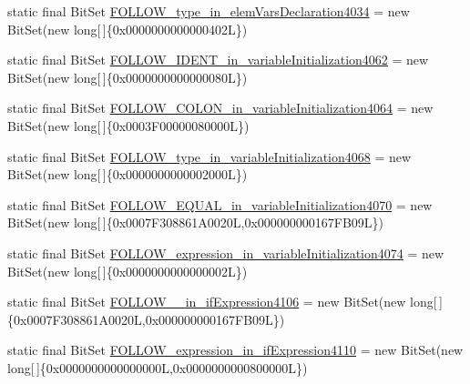 \begin{DoxyCompactItemize}
\item 
static final Bit\-Set \hyperlink{classorg_1_1tzi_1_1use_1_1parser_1_1soil_1_1_soil_parser_a12eb1d63a777ef50a70c44ec4f08d487}{F\-O\-L\-L\-O\-W\-\_\-type\-\_\-in\-\_\-elem\-Vars\-Declaration4034} = new Bit\-Set(new long\mbox{[}$\,$\mbox{]}\{0x0000000000000402\-L\})
\item 
static final Bit\-Set \hyperlink{classorg_1_1tzi_1_1use_1_1parser_1_1soil_1_1_soil_parser_aac9d43ff5383e251ea1eafdb3ba8c1ee}{F\-O\-L\-L\-O\-W\-\_\-\-I\-D\-E\-N\-T\-\_\-in\-\_\-variable\-Initialization4062} = new Bit\-Set(new long\mbox{[}$\,$\mbox{]}\{0x0000000000000080\-L\})
\item 
static final Bit\-Set \hyperlink{classorg_1_1tzi_1_1use_1_1parser_1_1soil_1_1_soil_parser_a033e6a9e5ca95da91d12c2d8c1af298e}{F\-O\-L\-L\-O\-W\-\_\-\-C\-O\-L\-O\-N\-\_\-in\-\_\-variable\-Initialization4064} = new Bit\-Set(new long\mbox{[}$\,$\mbox{]}\{0x0003\-F00000080000\-L\})
\item 
static final Bit\-Set \hyperlink{classorg_1_1tzi_1_1use_1_1parser_1_1soil_1_1_soil_parser_a450526e0ac8f03b5f2e28cf7db2d49fe}{F\-O\-L\-L\-O\-W\-\_\-type\-\_\-in\-\_\-variable\-Initialization4068} = new Bit\-Set(new long\mbox{[}$\,$\mbox{]}\{0x0000000000002000\-L\})
\item 
static final Bit\-Set \hyperlink{classorg_1_1tzi_1_1use_1_1parser_1_1soil_1_1_soil_parser_a358457878361f7db50a3e163aa9dbd37}{F\-O\-L\-L\-O\-W\-\_\-\-E\-Q\-U\-A\-L\-\_\-in\-\_\-variable\-Initialization4070} = new Bit\-Set(new long\mbox{[}$\,$\mbox{]}\{0x0007\-F308861\-A0020\-L,0x000000000167\-F\-B09\-L\})
\item 
static final Bit\-Set \hyperlink{classorg_1_1tzi_1_1use_1_1parser_1_1soil_1_1_soil_parser_aa61f0f308d5d55767c719d23d90a5dc1}{F\-O\-L\-L\-O\-W\-\_\-expression\-\_\-in\-\_\-variable\-Initialization4074} = new Bit\-Set(new long\mbox{[}$\,$\mbox{]}\{0x0000000000000002\-L\})
\item 
static final Bit\-Set \hyperlink{classorg_1_1tzi_1_1use_1_1parser_1_1soil_1_1_soil_parser_a5b3f37bd225b4ba62c2b13f7877f96c7}{F\-O\-L\-L\-O\-W\-\_\-\_\-in\-\_\-if\-Expression4106} = new Bit\-Set(new long\mbox{[}$\,$\mbox{]}\{0x0007\-F308861\-A0020\-L,0x000000000167\-F\-B09\-L\})
\item 
static final Bit\-Set \hyperlink{classorg_1_1tzi_1_1use_1_1parser_1_1soil_1_1_soil_parser_aed1ac7058c7f64103291697faabb2b44}{F\-O\-L\-L\-O\-W\-\_\-expression\-\_\-in\-\_\-if\-Expression4110} = new Bit\-Set(new long\mbox{[}$\,$\mbox{]}\{0x0000000000000000\-L,0x0000000000800000\-L\})

\end{DoxyCompactItemize}
